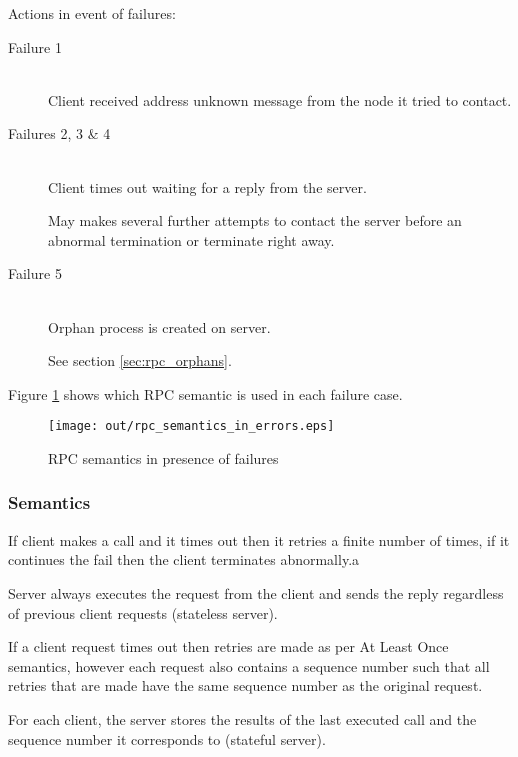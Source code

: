 \documentclass[a4paper]{article}
\begin{document}
Actions in event of failures:

\begin{description}
  \item[Failure 1] \hfill \\
    Client received address unknown message from the node it tried to contact.

  \item[Failures 2, 3 \& 4] \hfill \\
    Client times out waiting for a reply from the server.

    May makes several further attempts to contact the server before an abnormal
    termination or terminate right away.

  \item[Failure 5] \hfill \\
    Orphan process is created on server.

    See section \ref{sec:rpc_orphans}.

\end{description}

Figure \ref{fig:rpc_semantics_in_errors} shows which RPC semantic is used in
each failure case.

\begin{figure}[h!]
  \centering
  \texttt{[image: out/rpc\_semantics\_in\_errors.eps]}
  \caption{RPC semantics in presence of failures}
  \label{fig:rpc_semantics_in_errors}
\end{figure}

\subsubsection{Semantics}


If client makes a call and it times out then it retries a finite number of
times, if it continues the fail then the client terminates abnormally.a

Server always executes the request from the client and sends the reply
regardless of previous client requests (stateless server).


If a client request times out then retries are made as per At Least Once
semantics, however each request also contains a sequence number such that all
retries that are made have the same sequence number as the original request.

For each client, the server stores the results of the last executed call and the
sequence number it corresponds to (stateful server).
\end{document}
